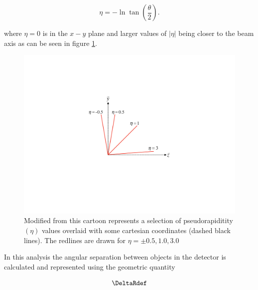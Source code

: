 \begin{equation}
 \eta = -\ln \tan \left( \frac{\theta}{2} \right).
\end{equation}

where $\eta = 0$ is in the $x-y$ plane and larger values of $|\eta|$ being
closer to the beam axis as can be seen in figure \ref{fig:pseudorapidity}.

\begin{figure}[!htbp]
  \begin{center}
    \includegraphics[width=0.5\linewidth]{figures/atlas/pseudorapidity}
    \caption{Modified from \cite{Stark:2317296} this cartoon represents a
selection of pseudorapiditity $(\eta)$ values overlaid with some cartesian
coordinates (dashed black lines).  The redlines are drawn for $\eta = \pm
0.5,1.0,3.0$ }
    \label{fig:pseudorapidity}
  \end{center}
\end{figure}

In this analysis the angular separation between objects in the detector is
calculated and represented using the geometric quantity 

\begin{equation}
 \DeltaRdef
\end{equation}
